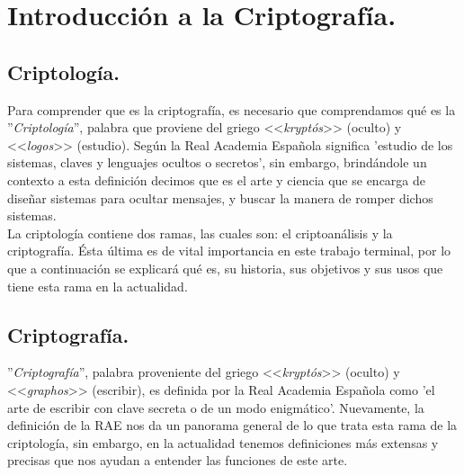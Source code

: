\documentclass[12pt, a4paper, titlepage]{report}
\begin{document}
	    \section{Introducción a la Criptografía.}
	        \subsection{Criptología.}
	            Para comprender que es la criptografía, es necesario que comprendamos qué es la ''\textit{Criptología}'', palabra que proviene del griego <<\textit{kryptós}>> (oculto) y <<\textit{logos}>> (estudio). Según la Real Academia Española significa 'estudio de los sistemas, claves y lenguajes ocultos o secretos', sin embargo, brindándole un contexto a esta definición decimos que es el arte y ciencia que se encarga de diseñar sistemas para ocultar mensajes, y buscar la manera de romper dichos sistemas. \cite{refCriptology}\\
	            La criptología contiene dos ramas, las cuales son: el criptoanálisis y la criptografía. Ésta última es de vital importancia en este trabajo terminal, por lo que a continuación se explicará qué es, su historia, sus objetivos y sus usos que tiene esta rama en la actualidad.
            \subsection{Criptografía.}
                ''\textit{Criptografía}'', palabra proveniente del griego <<\textit{kryptós}>> (oculto) y <<\textit{graphos}>> (escribir), es definida por la Real Academia Española como 'el arte de escribir con clave secreta o de un modo enigmático'. Nuevamente, la definición de la RAE nos da un panorama general de lo que trata esta rama de la criptología, sin embargo, en la actualidad tenemos definiciones más extensas y precisas que nos ayudan a entender las funciones de este arte.\\
                
\end{document}
